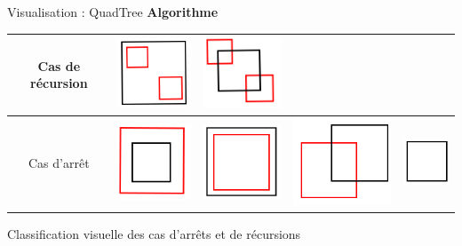 \documentclass[frames,pdf,slideColor,colorBG,accumulate,total]{prosper}
\begin{document}
  \begin{slide}[Box]{Visualisation : QuadTree}
    \textbf{Algorithme}
    \begin{table}[htbp]
      \centering
      \begin{tabular}{|c|cccc|}
        \hline
   Cas de récursion & \includegraphics[scale=0.20]{img/QT4}&  \includegraphics[scale=0.20]{img/QT5}& &\\
   \hline
   Cas d'arrêt&  \includegraphics[scale=0.20]{img/QT1}&  \includegraphics[scale=0.20]{img/QT2}&  \includegraphics[scale=0.20]{img/QT3}&  \includegraphics[scale=0.30]{img/QT6}\\
   \hline
      \end{tabular}
    \end{table}
Classification visuelle des cas d'arrêts et de récursions

  \end{slide}
\end{document}

